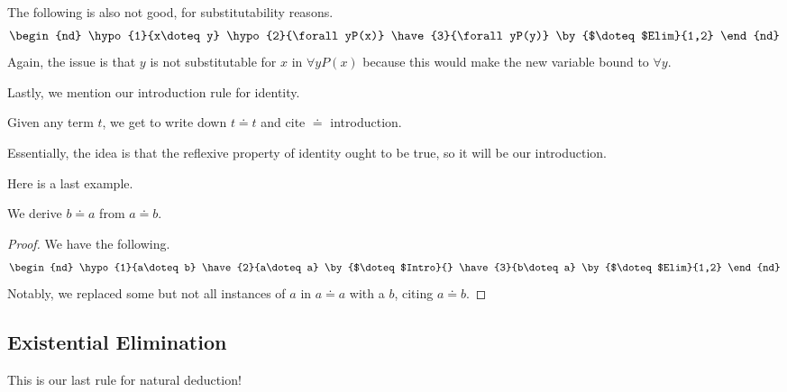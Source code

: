 \begin{nex}
	The following is also not good, for substitutability reasons.
	\begin{align*}
		\begin{nd}
			\hypo{1}{x\doteq y}
			\hypo{2}{\forall yP(x)}
			\have{3}{\forall yP(y)} \by{$\doteq $Elim}{1,2}
		\end{nd}
	\end{align*}
	Again, the issue is that $y$ is not substitutable for $x$ in $\forall yP(x)$ because this would make the new variable bound to $\forall y$.
\end{nex}
Lastly, we mention our introduction rule for identity.
\begin{defihelper} 
	Given any term $t$, we get to write down $t\doteq t$ and cite $\doteq$ introduction.
\end{defihelper}
Essentially, the idea is that the reflexive property of identity ought to be true, so it will be our introduction.

Here is a last example.
\begin{exe}[Symmetry]
	We derive $b\doteq a$ from $a\doteq b$.
\end{exe}
\begin{proof}
	We have the following.
	\begin{align*}
		\begin{nd}
			\hypo{1}{a\doteq b}
			\have{2}{a\doteq a} \by{$\doteq$Intro}{}
			\have{3}{b\doteq a} \by{$\doteq$Elim}{1,2}
		\end{nd}
	\end{align*}
	Notably, we replaced some but not all instances of $a$ in $a\doteq a$ with a $b$, citing $a\doteq b$.
\end{proof}

\subsection{Existential Elimination}
This is our last rule for natural deduction!

